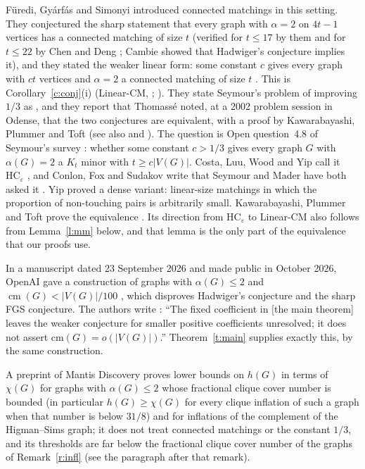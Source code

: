 \documentclass[11pt]{article}
\theoremstyle{definition}\newtheorem{conjecture}[theorem]{Conjecture}
\theoremstyle{remark}\newtheorem{remark}[theorem]{Remark}
\newcommand{\cm}{\operatorname{cm}}
\newcommand{\eps}{\varepsilon}
\begin{document}
F\"uredi, Gy\'arf\'as and Simonyi \cite{FGS} introduced connected matchings in this setting. They conjectured the sharp
statement that every graph with $\alpha=2$ on $4t-1$ vertices has a connected matching of size $t$
\cite[Conjecture~1.5]{FGS} (verified for $t\le17$ by them \cite[Theorem~1.6]{FGS} and for $t\le22$ by Chen and Deng
\cite{CD}; Cambie \cite{Cam} showed that Hadwiger's conjecture implies it), and they stated the weaker linear form: some
constant $c$ gives every graph with $ct$ vertices and $\alpha=2$ a connected matching of size $t$ \cite[Conjecture~1.4]{FGS}.
This is Corollary~\ref{c:conj}(i) (Linear-CM, \cite[Conjecture~1.8]{CLWY}; \cite[Conjecture~7.1]{CFS}). They state
Seymour's problem of improving $1/3$ as \cite[Conjecture~1.3]{FGS}, and they report that Thomass\'e noted, at a 2002
problem session in Odense, that the two conjectures are equivalent, with a proof by Kawarabayashi, Plummer and Toft
\cite{KPT} (see also \cite[Section~7]{CFS} and \cite[Section~1]{CLWY}). The question is Open question~4.8 of Seymour's
survey \cite{Sey}: whether some constant $c>1/3$ gives every graph $G$ with $\alpha(G)=2$ a $K_t$ minor with
$t\ge c|V(G)|$. Costa, Luu, Wood and Yip call it $\mathrm{HC}_\eps$ \cite[Conjecture~1.7]{CLWY}, and Conlon, Fox and Sudakov
write that Seymour and Mader have both asked it \cite[Section~7]{CFS}. Yip \cite[Theorem~7]{Yip} proved a dense variant:
linear-size matchings in which the proportion of non-touching pairs is arbitrarily small. Kawarabayashi, Plummer and
Toft prove the equivalence \cite[Theorem~1.5 and Section~4]{KPT}. Its direction from $\mathrm{HC}_\eps$ to Linear-CM also
follows from Lemma~\ref{l:mm} below, and that lemma is the only part of the equivalence that our proofs use.

In a manuscript dated 23 September 2026 and made public in October 2026, OpenAI gave a construction of graphs with
$\alpha(G)\le2$ and $\cm(G)<|V(G)|/100$ \cite[thm:main]{OAIH},
which disproves Hadwiger's conjecture and the sharp FGS conjecture. The authors write
\cite[subsection ``Historical context'']{OAIH}: ``The fixed coefficient in [the main theorem] leaves the weaker conjecture for
smaller positive coefficients unresolved; it does not assert $\mathrm{cm}(G)=o(|V(G)|)$.'' Theorem~\ref{t:main} supplies
exactly this, by the same construction.

A preprint of Mantis Discovery \cite{MD} proves lower bounds on $h(G)$ in terms of $\chi(G)$ for graphs with $\alpha(G)\le2$
whose fractional clique cover number is bounded (in particular $h(G)\ge\chi(G)$ for every clique inflation of such a graph
when that number is below $31/8$) and for inflations of the complement of the Higman--Sims graph; it does not treat
connected matchings or the constant $1/3$, and its thresholds are far below the fractional clique cover number of the
graphs of Remark~\ref{r:infl} (see the paragraph after that remark).
\end{document}
